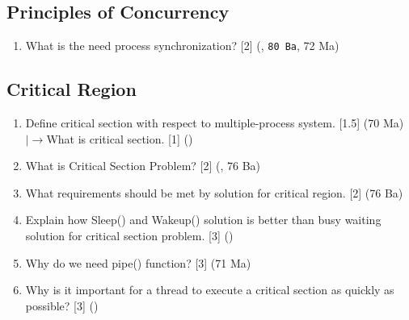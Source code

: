 \documentclass[12pt]{article}
\newcommand{\lb}{\\$\left|\rightarrow\right.$}
\begin{document}
	\subsection{Principles of Concurrency}
		\begin{enumerate}[noitemsep, topsep=0pt]
			\item What is the need process synchronization? \hfill [2] (, \texttt{80 Ba}, 72 Ma)
		\end{enumerate}
		
	\subsection{Critical Region}
		\begin{enumerate}[noitemsep, topsep=0pt]
			\item Define critical section with respect to multiple-process system. \hfill [1.5] (70 Ma)
			\lb What is critical section. \hfill [1] ()
			
			\item What is Critical Section Problem? \hfill [2] (, 76 Ba)

			\item What requirements should be met by solution for critical region. \hfill [2] (76 Ba)
			
			\item Explain how Sleep() and Wakeup() solution is better than busy waiting solution for critical section problem. \hfill [3] ()
			
			\item Why do we need pipe() function? \hfill [3] (71 Ma)
			
			\item Why is it important for a thread to execute a critical section as quickly as possible? \hfill [3] ()
		\end{enumerate}
		
\end{document}
